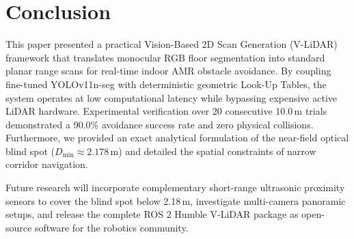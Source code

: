 \section{Conclusion}

This paper presented a practical Vision-Based 2D Scan Generation (V-LiDAR) framework that translates monocular RGB floor segmentation into standard planar range scans for real-time indoor AMR obstacle avoidance. By coupling fine-tuned YOLOv11n-seg with deterministic geometric Look-Up Tables, the system operates at low computational latency while bypassing expensive active LiDAR hardware. Experimental verification over 20 consecutive 10.0\,m trials demonstrated a 90.0\% avoidance success rate and zero physical collisions. Furthermore, we provided an exact analytical formulation of the near-field optical blind spot ($D_{\text{min}} \approx 2.178\,\text{m}$) and detailed the spatial constraints of narrow corridor navigation. 

Future research will incorporate complementary short-range ultrasonic proximity sensors to cover the blind spot below 2.18\,m, investigate multi-camera panoramic setups, and release the complete ROS 2 Humble V-LiDAR package as open-source software for the robotics community.
